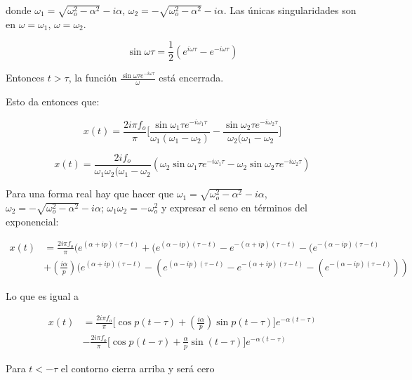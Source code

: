 \documentclass[11pt]{report}
\theoremstyle{plain}
\theoremstyle{definition}
\begin{document}
donde $\omega_1=\sqrt{\omega^2_o -\alpha^2}-i\alpha$, $\omega_2=-\sqrt{\omega^2_o -\alpha^2}-i\alpha$. Las únicas singularidades son en $\omega=\omega_1$, $\omega=\omega_2$.

\begin{equation*}
	\sin\omega\tau = \frac{1}{2}(e^{i\omega\tau}-e^{-i\omega\tau})
\end{equation*}

Entonces $t>\tau$, la función $\frac{\sin\omega\tau e^{-i\omega\tau}}{\omega}$ está encerrada.

Esto da entonces que:

\begin{equation*}
	x(t)=\frac{2i\pi f_o}{\pi} \lbrack \frac{ \sin\omega_{1}\tau e^{-i\omega_1\tau} }{\omega_1(\omega_1-\omega_2)} -\frac{ \sin\omega_{2}\tau e^{-i\omega_2\tau} }{\omega_2(\omega_1-\omega_2}\rbrack
\end{equation*}

\begin{equation*}
	x(t)=\frac{2if_o}{\omega_1 \omega_2(\omega_1-\omega_2}(\omega_2\sin\omega_{1}\tau e^{-i\omega_1\tau} - \omega_2\sin\omega_{2}\tau e^{-i\omega_2\tau})
\end{equation*}

Para una forma real hay que hacer que  $\omega_1 =\sqrt{\omega^2_o -\alpha^2}-i\alpha$, $\omega_2=-\sqrt{\omega^2_o -\alpha^2}-i\alpha$; $\omega_1\omega_2 = -\omega^2_o$ y expresar el seno en términos del exponencial:

\begin{align*}
	x(t)&=\frac{2i\pi f_o}{\pi}(e^{(\alpha+ip)(\tau-t)} + (e^{(\alpha-ip)(\tau-t)} - e^{-(\alpha+ip)(\tau-t)} - (e^{-(\alpha-ip)(\tau-t)}\\
	&+(\frac{i\alpha}{p})(e^{(\alpha+ip)(\tau-t)} - (e^{(\alpha-ip)(\tau-t)} - e^{-(\alpha+ip)(\tau-t)} - (e^{-(\alpha-ip)(\tau-t)} ))
\end{align*}

Lo que es igual a


\begin{align*}
	x(t)&=\frac{2i\pi f_o}{\pi}\lbrack\cos p(t-\tau) + (\frac{i\alpha}{p})\sin p(t-\tau)\rbrack e^{-\alpha(t-\tau)}\\ 
	&- \frac{2i\pi f_o}{\pi}\lbrack \cos p(t-\tau) + \frac{\alpha}{p}\sin(t-\tau)\rbrack e^{-\alpha(t-\tau)}
\end{align*}

Para $t<-\tau$ el contorno cierra arriba y será cero
\end{document}
